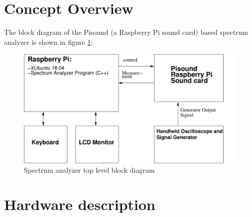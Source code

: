 \documentclass[11pt, oneside]{scrartcl}   	%
\begin{document}
\section{Concept Overview}
The block diagram of the Pisound (a Raspberry Pi sound card) based spectrum analyzer is shown in figure \ref{fig:toplevelfunctionalblock}:
\begin{figure}[tbph]
	\centering
	\includegraphics[width=\linewidth]{TopLevelFunctionalBlock}
	\caption[Spectrum analyzer top level block diagram]{Spectrum analyzer top level block diagram}
	\label{fig:toplevelfunctionalblock}
\end{figure}
\newpage
\section{Hardware description}
\end{document}
